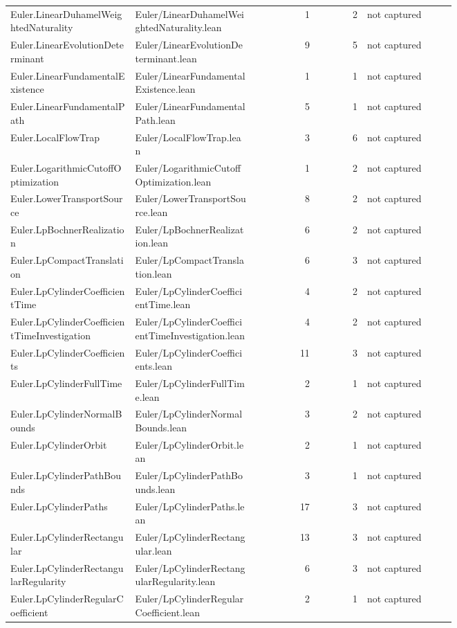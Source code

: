\documentclass[10pt]{article}
\begin{document}
\begin{longtable}{p{0.28\linewidth}p{0.27\linewidth}r r p{0.20\linewidth}}
Euler.LinearDuhamelWeightedNaturality & Euler/LinearDuhamelWeightedNaturality.lean & 1 & 2 & not captured\\
Euler.LinearEvolutionDeterminant & Euler/LinearEvolutionDeterminant.lean & 9 & 5 & not captured\\
Euler.LinearFundamentalExistence & Euler/LinearFundamentalExistence.lean & 1 & 1 & not captured\\
Euler.LinearFundamentalPath & Euler/LinearFundamentalPath.lean & 5 & 1 & not captured\\
Euler.LocalFlowTrap & Euler/LocalFlowTrap.lean & 3 & 6 & not captured\\
Euler.LogarithmicCutoffOptimization & Euler/LogarithmicCutoffOptimization.lean & 1 & 2 & not captured\\
Euler.LowerTransportSource & Euler/LowerTransportSource.lean & 8 & 2 & not captured\\
Euler.LpBochnerRealization & Euler/LpBochnerRealization.lean & 6 & 2 & not captured\\
Euler.LpCompactTranslation & Euler/LpCompactTranslation.lean & 6 & 3 & not captured\\
Euler.LpCylinderCoefficientTime & Euler/LpCylinderCoefficientTime.lean & 4 & 2 & not captured\\
Euler.LpCylinderCoefficientTimeInvestigation & Euler/LpCylinderCoefficientTimeInvestigation.lean & 4 & 2 & not captured\\
Euler.LpCylinderCoefficients & Euler/LpCylinderCoefficients.lean & 11 & 3 & not captured\\
Euler.LpCylinderFullTime & Euler/LpCylinderFullTime.lean & 2 & 1 & not captured\\
Euler.LpCylinderNormalBounds & Euler/LpCylinderNormalBounds.lean & 3 & 2 & not captured\\
Euler.LpCylinderOrbit & Euler/LpCylinderOrbit.lean & 2 & 1 & not captured\\
Euler.LpCylinderPathBounds & Euler/LpCylinderPathBounds.lean & 3 & 1 & not captured\\
Euler.LpCylinderPaths & Euler/LpCylinderPaths.lean & 17 & 3 & not captured\\
Euler.LpCylinderRectangular & Euler/LpCylinderRectangular.lean & 13 & 3 & not captured\\
Euler.LpCylinderRectangularRegularity & Euler/LpCylinderRectangularRegularity.lean & 6 & 3 & not captured\\
Euler.LpCylinderRegularCoefficient & Euler/LpCylinderRegularCoefficient.lean & 2 & 1 & not captured\\

\end{longtable}
\end{document}
